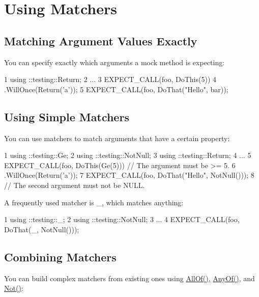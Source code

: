\section*{Using Matchers}

\subsection*{Matching Argument Values Exactly}

You can specify exactly which arguments a mock method is expecting\+:


\begin{DoxyCode}
1 using ::testing::Return;
2 ...
3   EXPECT\_CALL(foo, DoThis(5))
4       .WillOnce(Return('a'));
5   EXPECT\_CALL(foo, DoThat("Hello", bar));
\end{DoxyCode}


\subsection*{Using Simple Matchers}

You can use matchers to match arguments that have a certain property\+:


\begin{DoxyCode}
1 using ::testing::Ge;
2 using ::testing::NotNull;
3 using ::testing::Return;
4 ...
5   EXPECT\_CALL(foo, DoThis(Ge(5)))  // The argument must be >= 5.
6       .WillOnce(Return('a'));
7   EXPECT\_CALL(foo, DoThat("Hello", NotNull()));
8   // The second argument must not be NULL.
\end{DoxyCode}


A frequently used matcher is {\ttfamily \+\_\+}, which matches anything\+:


\begin{DoxyCode}
1 using ::testing::\_;
2 using ::testing::NotNull;
3 ...
4   EXPECT\_CALL(foo, DoThat(\_, NotNull()));
\end{DoxyCode}


\subsection*{Combining Matchers}

You can build complex matchers from existing ones using {\ttfamily \hyperlink{namespacetesting_af7618e8606c1cb45738163688944e2b7}{All\+Of()}}, {\ttfamily \hyperlink{namespacetesting_a81cfefd9f75cdce827d5bc873cf73aac}{Any\+Of()}}, and {\ttfamily \hyperlink{namespacetesting_a3d7d0dda7e51b13fe2f5aa28e23ed6b6}{Not()}}\+:



